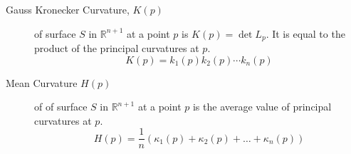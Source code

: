 \begin{description}
	\item[Gauss Kronecker Curvature, $K(p)$] of surface $S$ in $\mathbb{R}^{n+1}$ at a point $p$ is $K(p) = \det L_p$.
		It is equal to the product of the principal curvatures at $p$.
	\begin{equation}
		K(p) = k_1(p) k_2(p) \cdots k_n(p)
	\end{equation}
\item[Mean Curvature $H(p)$] of of surface $S$ in $\mathbb{R}^{n+1}$ at a point $p$ is the average value of principal curvatures at $p$.
	\begin{equation}
		H(p) = \frac{1}{n} (\kappa_1(p) + \kappa_2(p) + \dots + \kappa_n(p))
	\end{equation}
\end{description}

